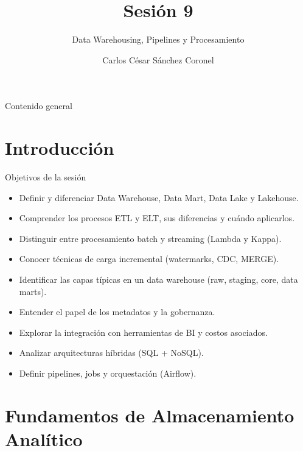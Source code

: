 \documentclass[aspectratio=169, 10pt, xcolor=table]{beamer}
\title[SESIÓN 9 BBDD]{\textbf{Sesión 9}}
\subtitle{Data Warehousing, Pipelines y Procesamiento }
\author[Prof. C. Sánchez]{Carlos César Sánchez Coronel}
\institute{\textbf{BASES DE DATOS}}
\date{}
\begin{document}
\begin{frame}
    \titlepage
\end{frame}

\begin{frame}{Contenido general}
    \tableofcontents
\end{frame}

\section{Introducción}

\begin{frame}{Objetivos de la sesión}
    \begin{itemize}
        \item Definir y diferenciar Data Warehouse, Data Mart, Data Lake y Lakehouse.
        \item Comprender los procesos ETL y ELT, sus diferencias y cuándo aplicarlos.
        \item Distinguir entre procesamiento batch y streaming (Lambda y Kappa).
        \item Conocer técnicas de carga incremental (watermarks, CDC, MERGE).
        \item Identificar las capas típicas en un data warehouse (raw, staging, core, data marts).
        \item Entender el papel de los metadatos y la gobernanza.
        \item Explorar la integración con herramientas de BI y costos asociados.
        \item Analizar arquitecturas híbridas (SQL + NoSQL).
        \item Definir pipelines, jobs y orquestación (Airflow).
    \end{itemize}
\end{frame}

\section{Fundamentos de Almacenamiento Analítico}
\end{document}
